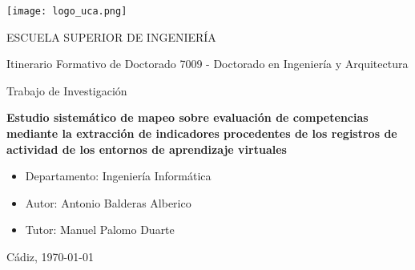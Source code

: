 

\begin{center}

  \texttt{[image: logo\_uca.png]} \\

  \vspace{2.0cm}

  \Large{ESCUELA SUPERIOR DE INGENIERÍA} \\

  \vspace{1.0cm}

  \large{Itinerario Formativo de Doctorado 7009 - Doctorado en Ingeniería y Arquitectura} \\

  \vspace{2.0cm}

  \large{Trabajo de Investigación} \\

  \vspace{1.0cm}

  \Large{\textbf{Estudio sistemático de mapeo sobre evaluación de competencias mediante la extracción de indicadores procedentes de los registros de actividad de los entornos de aprendizaje virtuales}} \\
    
  \vspace{3.0cm}

\end{center}

\begin{itemize}
\item \large{Departamento: Ingeniería Informática}
\item \large{Autor: Antonio Balderas Alberico}
\item \large{Tutor: Manuel Palomo Duarte}
\end{itemize}

\vspace{1.0cm}

\begin{flushright}
  \large{Cádiz, \today} \\

\end{flushright}
